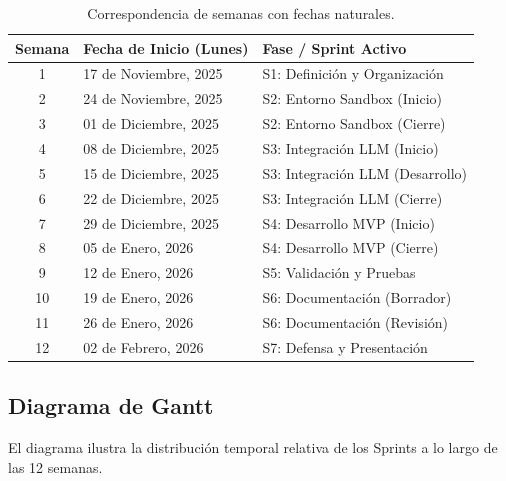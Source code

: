 \documentclass[12pt,a4paper]{article}
\begin{document}
\begin{table}[H]
\centering
\renewcommand{\arraystretch}{1.3} %
\begin{tabular}{|c|l|l|}
\hline
\rowcolor{headergray} \textbf{Semana} & \textbf{Fecha de Inicio (Lunes)} & \textbf{Fase / Sprint Activo} \\ \hline
1  & 17 de Noviembre, 2025 & S1: Definición y Organización \\ \hline
2  & 24 de Noviembre, 2025 & S2: Entorno Sandbox (Inicio) \\ \hline
3  & 01 de Diciembre, 2025 & S2: Entorno Sandbox (Cierre) \\ \hline
4  & 08 de Diciembre, 2025 & S3: Integración LLM (Inicio) \\ \hline
5  & 15 de Diciembre, 2025 & S3: Integración LLM (Desarrollo) \\ \hline
6  & 22 de Diciembre, 2025 & S3: Integración LLM (Cierre) \\ \hline
7  & 29 de Diciembre, 2025 & S4: Desarrollo MVP (Inicio) \\ \hline
8  & 05 de Enero, 2026     & S4: Desarrollo MVP (Cierre) \\ \hline
9  & 12 de Enero, 2026     & S5: Validación y Pruebas \\ \hline
10 & 19 de Enero, 2026     & S6: Documentación (Borrador) \\ \hline
11 & 26 de Enero, 2026     & S6: Documentación (Revisión) \\ \hline
12 & 02 de Febrero, 2026   & S7: Defensa y Presentación \\ \hline
\end{tabular}
\caption{Correspondencia de semanas con fechas naturales.}
\end{table}

\subsection{Diagrama de Gantt}

El diagrama ilustra la distribución temporal relativa de los Sprints a lo largo de las 12 semanas.
\end{document}

